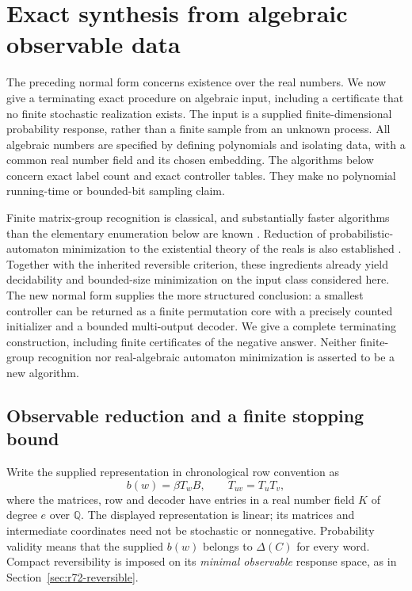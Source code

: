 \section{Exact synthesis from algebraic observable data}\label{sec:r73-algebraic}
The preceding normal form concerns existence over the real numbers. We now
give a terminating exact procedure on algebraic input, including a certificate
that no finite stochastic realization exists. The input is a supplied
finite-dimensional probability response, rather than a finite sample from an
unknown process. All algebraic numbers are specified by defining polynomials
and isolating data, with a common real number field and its chosen embedding.
The algorithms below concern exact label count and exact controller tables.
They make no polynomial running-time or bounded-bit sampling claim.

Finite matrix-group recognition is classical, and substantially faster
algorithms than the elementary enumeration below are known
\cite{BabaiBealsRockmore93,Serre07}. Reduction of probabilistic-automaton
minimization to the existential theory of the reals is also established
\cite{KieferWachter14}. Together with the inherited reversible criterion,
these ingredients already yield decidability and bounded-size minimization
on the input class considered here. The new normal form supplies the more
structured conclusion: a smallest controller can be returned as a finite
permutation core with a precisely counted initializer and a bounded
multi-output decoder. We give a complete terminating construction, including
finite certificates of the negative answer. Neither finite-group recognition
nor real-algebraic automaton minimization is asserted to be a new algorithm.

\subsection{Observable reduction and a finite stopping bound}
Write the supplied representation in chronological row convention as
\begin{equation}\label{eq:r73-algebraic-input}
 b(w)=\beta T_w B,\qquad T_{uv}=T_uT_v,
\end{equation}
where the matrices, row and decoder have entries in a real number field
$K$ of degree $e$ over $\mathbb Q$. The displayed representation is linear;
its matrices and intermediate coordinates need not be stochastic or
nonnegative. Probability validity means that the supplied $b(w)$ belongs to
$\Delta(C)$ for every word. Compact reversibility is imposed on its
\emph{minimal observable} response space, as in
Section~\ref{sec:r72-reversible}.

